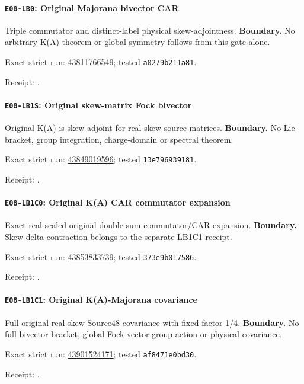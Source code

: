 \paragraph{\texttt{E08-LB0}: Original Majorana bivector CAR}
Triple commutator and distinct-label physical skew-adjointness.
\textbf{Boundary.} No arbitrary K(A) theorem or global symmetry follows from this gate alone.
\par\noindent Exact strict run: \href{https://github.com/etblink/math/actions/runs/43811766549}{43811766549}; tested \texttt{a0279b211a81}.\par
\begingroup\small\sloppy\noindent Receipt: .\par\endgroup
\paragraph{\texttt{E08-LB1S}: Original skew-matrix Fock bivector}
Original K(A) is skew-adjoint for real skew source matrices.
\textbf{Boundary.} No Lie bracket, group integration, charge-domain or spectral theorem.
\par\noindent Exact strict run: \href{https://github.com/etblink/math/actions/runs/43849019596}{43849019596}; tested \texttt{13e796939181}.\par
\begingroup\small\sloppy\noindent Receipt: .\par\endgroup
\paragraph{\texttt{E08-LB1C0}: Original K(A) CAR commutator expansion}
Exact real-scaled original double-sum commutator/CAR expansion.
\textbf{Boundary.} Skew delta contraction belongs to the separate LB1C1 receipt.
\par\noindent Exact strict run: \href{https://github.com/etblink/math/actions/runs/43853833739}{43853833739}; tested \texttt{373e9b017586}.\par
\begingroup\small\sloppy\noindent Receipt: .\par\endgroup
\paragraph{\texttt{E08-LB1C1}: Original K(A)-Majorana covariance}
Full original real-skew Source48 covariance with fixed factor 1/4.
\textbf{Boundary.} No full bivector bracket, global Fock-vector group action or physical covariance.
\par\noindent Exact strict run: \href{https://github.com/etblink/math/actions/runs/43901524171}{43901524171}; tested \texttt{af8471e0bd30}.\par
\begingroup\small\sloppy\noindent Receipt: .\par\endgroup
